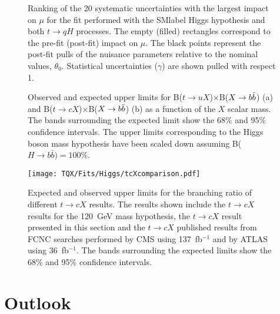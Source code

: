 \begin{figure}[htb]
    \RawFloats
    \centering
    \caption{Ranking of the 20 systematic uncertainties with the largest impact on $\mu$ for the fit performed with the \acrshort{SMlabel} Higgs hypothesis and both $t\to qH$ processes. The empty (filled) rectangles correspond  to the pre-fit (post-fit) impact on $\mu$. The black points represent the post-fit pulls of the nuisance parameters relative to the nominal values, $\theta_0$. Statistical uncertainties ($\gamma$) are shown pulled with respect 1.}
    \label{tqX:RankqH}
\end{figure}
\clearpage

\begin{figure}[htb]
    \RawFloats
    \centering
    \caption{Observed and expected upper limits for B($t\to uX$)$\times$B($X\to b\bar{b}$) (a) and B($t\to cX$)$\times$B($X\to b\bar{b}$) (b) as a function of the $X$ scalar mass. The bands surrounding the expected limit show the 68\% and 95\% confidence intervals. The upper limits corresponding to the Higgs boson mass hypothesis have been scaled down assuming B($H \rightarrow b \bar{b}) = 100\%$.}
    \label{tqX:limitIncH}
\end{figure}

\begin{figure}[htb]
    \RawFloats
    \centering
    \texttt{[image: TQX/Fits/Higgs/tcXcomparison.pdf]}
    \caption{Expected and observed upper limits for the branching ratio of different $t\to cX$ results. The results shown include the $t\to cX$ results for the 120~GeV mass hypothesis, the $t\to cX$ result presented in this section and the $t\to cX$ published results from FCNC searches performed by CMS using 137~fb$^{-1}$ and by ATLAS using 36~fb$^{-1}$. The bands surrounding the expected limits show the 68\% and 95\% confidence intervals.}
    \label{tqX:cHlimitcomparison}
\end{figure}

\section{Outlook}

